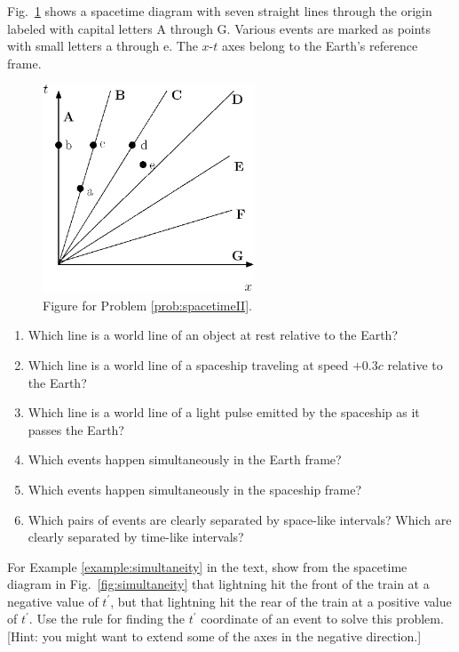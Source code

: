 \begin{problem}
Fig.~\ref{fig:spacetimeII} shows a spacetime diagram with seven straight lines
through the origin labeled with capital letters A through G.  Various
events are marked as points with small letters a through e.  The $x$-$t$
axes belong to the Earth's reference frame.

\begin{figure}[htbp]
\begin{center}
\includegraphics[width=2.5in]{relativistic_spacetime/p_spacetimeII}
\caption{Figure for Problem \ref{prob:spacetimeII}.}
\label{fig:spacetimeII}
\end{center}
\end{figure}
 
\begin{enumerate}
\item Which line is a world line of an object at rest relative to the Earth?
\item Which line is a world line of a spaceship traveling at speed  
$+0.3c$ relative to the Earth?
\item Which line is a world line of a light pulse emitted by the
spaceship as it passes the Earth? 
\item Which events happen simultaneously in the Earth frame?  
\item  Which events happen simultaneously in the spaceship frame?  
\item Which pairs of events are clearly separated by space-like
intervals?  Which are clearly separated by time-like intervals?
\end{enumerate}
\label{prob:spacetimeII}
\end{problem}

\begin{problem}
For Example \ref{example:simultaneity} in the text, show from
the spacetime diagram in Fig.~\ref{fig:simultaneity} that lightning
hit the front of the train at a negative value of $t^\prime$, but that
lightning hit the rear of the train at a positive value of $t^\prime$.
Use the rule for finding the $t^\prime$ coordinate of an event to
solve this problem.  [Hint: you might want to extend some of the axes
in the negative direction.]  
\end{problem}

